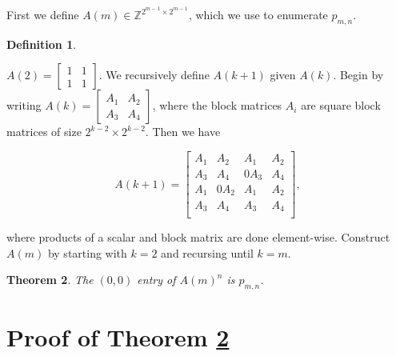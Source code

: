 \documentclass[12pt]{article}
\theoremstyle{plain}
\newtheorem{thm}{Theorem}
\theoremstyle{definition}
\newtheorem{defn}[thm]{Definition}
\theoremstyle{remark}
\theoremstyle{definition}
\begin{document}
First we define $A(m) \in \mathbb{Z}^{2^{m-1} \times 2^{m-1}}$, which we use to enumerate $p_{m,n}$.

\begin{defn}
\label{defn: A}

$A(2) = \begin{bmatrix}
1 & 1 \\
1 & 1
\end{bmatrix}
$. We recursively define $A(k+1)$ given $A(k)$. Begin by writing
$
A(k) = \begin{bmatrix}
A_1 & A_2 \\
A_3 & A_4
\end{bmatrix}
$, where the block matrices $A_i$ are square block matrices of size $2^{k-2} \times 2^{k-2}$. Then we have

$$
A(k+1) = \begin{bmatrix}
A_1 & A_2 & A_1 & A_2 \\
A_3 & A_4 & 0A_3 & A_4 \\
A_1 & 0A_2 & A_1 & A_2 \\
A_3 & A_4 & A_3 & A_4 \\
\end{bmatrix},
$$

where products of a scalar and block matrix are done element-wise. Construct $A(m)$ by starting with $k=2$ and recursing until $k=m$. 

\end{defn}

\begin{thm}
\label{thm: main theorem}    
The $(0,0)$ entry of $A(m)^n$ is $p_{m,n}$.
\end{thm}

\section{Proof of Theorem \ref{thm: main theorem}}
\end{document}
